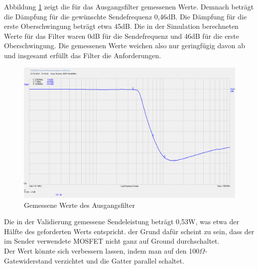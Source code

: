Abbildung \ref{filter} zeigt die für das Ausgangsfilter gemessenen Werte. Demnach beträgt die Dämpfung für die gewünschte Sendefrequenz 0,46dB. Die Dämpfung für die erste Oberschwingung beträgt etwa 45dB. Die in der Simulation berechneten Werte für das Filter waren 0dB für die Sendefrequenz und 46dB für die erste Oberschwingung. Die gemessenen Werte weichen also nur geringfügig davon ab und insgesamt erfüllt das Filter die Anforderungen.\\
\begin{figure}[H]\centering
	\includegraphics[width=16cm]{res/Filterwerte.png}
	\caption{Gemessene Werte des Ausgangsfilter}
	\label{filter}
\end{figure}

Die in der Validierung gemessene Sendeleistung beträgt 0,53W, was etwa der Hälfte des geforderten Werts entspricht. der Grund dafür scheint zu sein, dass der im Sender verwendete MOSFET nicht ganz auf Ground durchschaltet.\\
Der Wert könnte sich verbessern lassen, indem man auf den 100$\Omega$-Gatewiderstand verzichtet und die Gatter parallel schaltet.
